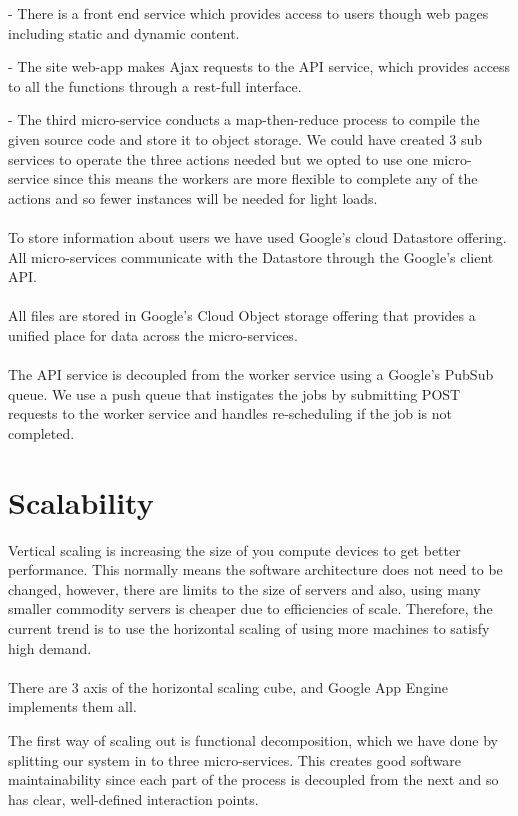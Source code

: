 \documentclass[conference]{IEEEtran}
\begin{document}
- There is a front end service which provides access to users though web pages including static and dynamic content.

- The site web-app makes Ajax requests to the API service, which provides access to all the functions through a rest-full interface.

- The third micro-service conducts a map-then-reduce process to compile the given source code and store it to object storage. We could have created 3 sub services to operate the three actions needed but we opted to use one micro-service since this means the workers are more flexible to complete any of the actions and so fewer instances will be needed for light loads.
\\\\
To store information about users we have used Google's cloud Datastore offering. All micro-services communicate with the Datastore through the Google's client API.
\\\\
All files are stored in Google's Cloud Object storage offering that provides a unified place for data across the micro-services.
\\\\
The API service is decoupled from the worker service using a Google's PubSub queue. We use a push queue that instigates the jobs by submitting POST requests to the worker service and handles re-scheduling if the  job is not completed.

\section{Scalability}

Vertical scaling is increasing the size of you compute devices to get better performance. This normally means the software architecture does not need to be changed, however, there are limits to the size of servers and also, using many smaller commodity servers is cheaper due to efficiencies of scale. Therefore, the current trend is to use the horizontal scaling of using more machines to satisfy high demand.
\\\\
There are 3 axis of the horizontal scaling cube, and Google App Engine implements them all.

The first way of scaling out is functional decomposition, which we have done by splitting our system in to three micro-services. This creates good software maintainability since each part of the process is decoupled from the next and so has clear, well-defined interaction points.
\end{document}
